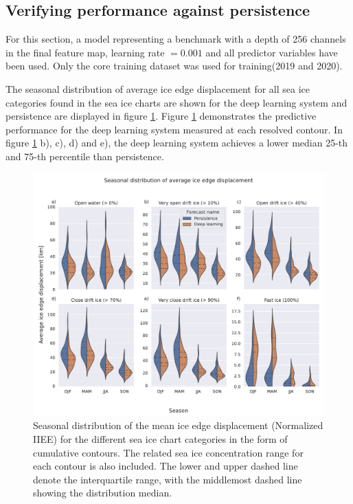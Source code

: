 \documentclass[../main/thesis.tex]{subfiles}
\begin{document}
\subsection{Verifying performance against persistence}
\label{sec:performance-persistence}
For this section, a model representing a benchmark with a depth of 256 channels in the final feature map, learning rate $=0.001$ and all predictor variables have been used. Only the core training dataset was used for training(2019 and 2020).

The seasonal distribution of average ice edge displacement for all sea ice categories found in the sea ice charts are shown for the deep learning system and persistence are displayed in figure \ref{fig:violins}. Figure \ref{fig:violins} demonstrates the predictive performance for the deep learning system measured at each resolved contour. In figure \ref{fig:violins} b), c), d) and e), the deep learning system achieves a lower median 25-th and 75-th percentile than persistence.

\begin{figure}
    \centering
    \includegraphics[width=\textwidth]{niiee}
    \caption{\label{fig:violins}Seasonal distribution of the mean ice edge displacement (Normalized IIEE) for the different sea ice chart categories in the form of cumulative contours. The related sea ice concentration range for each contour is also included. The lower and upper dashed line denote the interquartile range, with the middlemost dashed line showing the distribution median.}
\end{figure}
\end{document}
